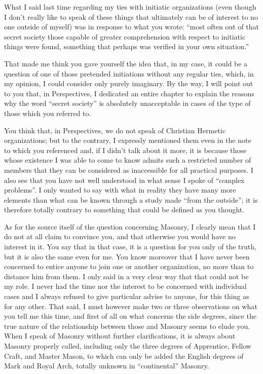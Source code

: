 What I said last time regarding my ties with initiatic organizations (even though I don't really like to speak of these things that ultimately can be of interest to no one outside of myself) was in response to what you wrote: ``most often out of that secret society those capable of greater comprehension with respect to initiatic things were found, something that perhaps was verified in your own situation.''

That made me think you gave yourself the idea that, in my case, it could be a question of one of those pretended initiations without any regular ties, which, in my opinion, I could consider only purely imaginary. By the way, I will point out to you that, in Perspectives, I dedicated an entire chapter to explain the reasons why the word ``secret society'' is absolutely unacceptable in cases of the type of those which you referred to.

You think that, in Perspectives, we do not speak of Christian Hermetic organizations; but to the contrary, I expressly mentioned them even in the note to which you referenced and, if I didn't talk about it more, it is because those whose existence I was able to come to know admits such a restricted number of members that they can be considered as inaccessible for all practical purposes. I also see that you have not well understood in what sense I spoke of ``complex problems''. I only wanted to say with what in reality they have many more elements than what can be known through a study made ``from the outside''; it is therefore totally contrary to something that could be defined as you thought.

As for the source itself of the question concerning Masonry, I clearly mean that I do not at all claim to convince you, and that otherwise you would have no interest in it. You say that in that case, it is a question for you only of the truth, but it is also the same even for me. You know moreover that I have never been concerned to entice anyone to join one or another organization, no more than to distance him from them. I only said in a very clear way that that could not be my role. I never had the time nor the interest to be concerned with individual cases and I always refused to give particular advise to anyone, for this thing as for any other. That said, I must however make two or three observations on what you tell me this time, and first of all on what concerns the side degrees, since the true nature of the relationship between those and Masonry seems to elude you. When I speak of Masonry without further clarifications, it is always about Masonry properly called, including only the three degrees of Apprentice, Fellow Craft, and Master Mason, to which can only be added the English degrees of Mark and Royal Arch, totally unknown in ``continental'' Masonry.

